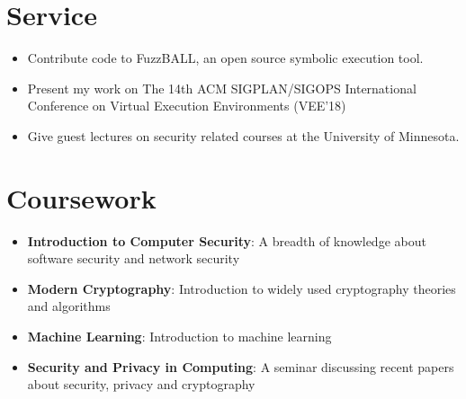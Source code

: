 \documentclass[letterpaper,11pt]{article}
\newcommand{\brief}[2]{
  \item[]\small{
    \textbf{#1}{: #2 \vspace{-2pt}}
  }
}
\newcommand{\myitem}[1]{
  \item[-]\small{
    { #1 \vspace{-2pt}}
  }
}
\newcommand{\content}{\begin{itemize}[leftmargin=0px]}
\newcommand{\contentend}{\end{itemize}}
\newcommand{\mylist}{\begin{itemize}[leftmargin=25px,rightmargin=25px]}
\newcommand{\mylistend}{\end{itemize}\vspace{-5pt}}
\begin{document}
\section{Service}
\mylist
\myitem{Contribute code to FuzzBALL, an open source symbolic execution tool.}
\myitem{Present my work on The 14th ACM SIGPLAN/SIGOPS International Conference on Virtual Execution Environments (VEE'18)}
\myitem{Give guest lectures on security related courses at the University of Minnesota.}
\mylistend

%
\section{Coursework}
  \content
    \brief
      {Introduction to Computer Security}
      {A breadth of knowledge about software security and network security}   
    \brief
      {Modern Cryptography}
      {Introduction to widely used cryptography theories and algorithms}
    \brief
      {Machine Learning}
      {Introduction to machine learning}      
    \brief
      {Security and Privacy in Computing}
      {A seminar discussing recent papers about security, privacy and cryptography}
  \contentend  



\end{document}
